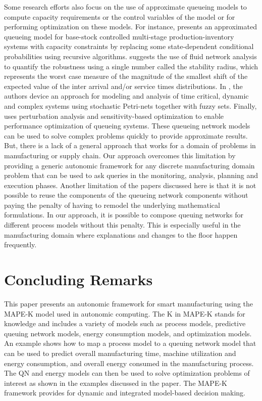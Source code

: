 \documentclass[a4paper, 12pt]{article} %
\begin{document}
Some research efforts also focus on the use of approximate queueing models to compute capacity requirements or the control variables of the model or for performing optimization on these models. For instance, \cite{Avsar2014}
presents an approximated queueing model for base-stock controlled multi-stage production-inventory systems with capacity constraints by replacing some state-dependent conditional probabilities using recursive algorithms. \cite{Schonlein2013} suggests the use of fluid network analysis to quantify the robustness using a single number called the stability radius, which represents the worst case measure of the magnitude of the smallest shift of the expected value of the inter arrival and/or service times distributions. In \cite{Tuysuz2009}, the authors device an approach for modeling and analysis of time critical, dynamic and complex systems using stochastic Petri-nets together with fuzzy sets. Finally, \cite{Xia2011} uses perturbation analysis and sensitivity-based optimization to enable performance optimization of queueing systems. These queueing network models can be used to solve complex problems quickly to provide approximate results. But, there is a lack of a general approach that works for a domain of problems in manufacturing or supply chain. Our approach overcomes this  limitation by providing a generic autonomic framework for any discrete manufacturing domain problem that can be used to ask queries in the monitoring, analysis, planning and execution phases. Another limitation of the papers discussed here is  that it is not possible to reuse the components of the queueing network components without paying the penalty of having to remodel the underlying mathematical formulations. In our approach, it is possible to compose queuing networks for different process models without this penalty. This is especially useful in the manufacturing domain where explanations and changes to the floor happen frequently.



\section{Concluding Remarks} \label{sec:conc}

This paper presents an autonomic framework for smart manufacturing using the MAPE-K model used in autonomic computing. The K in MAPE-K stands for knowledge and includes a variety of models such as process models, predictive queuing network models, energy consumption models, and optimization models. An example shows how to map a process model to a queuing network model that can be used to predict overall manufacturing time, machine utilization and energy consumption, and overall energy consumed in the manufacturing process. The QN and energy models can then be used to solve optimization problems of interest as shown in the examples discussed in the paper. The MAPE-K framework provides for dynamic and integrated model-based decision making.
 
\end{document}

